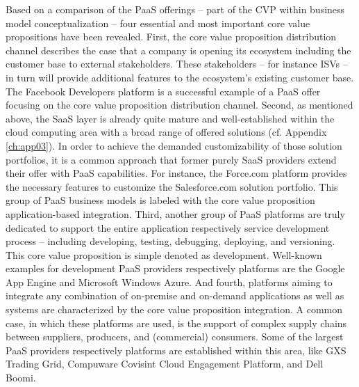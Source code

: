 Based on a comparison of the \ac{PaaS} offerings -- part of the \ac{CVP} within \citet{Johnson2008} business model conceptualization -- four essential and most important core value propositions have been revealed.  First, the core value proposition distribution channel describes the case that a company is opening its ecosystem including the customer base to external stakeholders. These stakeholders -- for instance \acp{ISV} -- in turn will provide additional features to the ecosystem's existing customer base. The Facebook Developers platform is a successful example of a \ac{PaaS} offer focusing on the core value proposition distribution channel. Second, as mentioned above, the \ac{SaaS} layer is already quite mature and well-established within the cloud computing area with a broad range of offered solutions (cf. Appendix \ref{ch:app03}). In order to achieve the demanded customizability of those solution portfolios, it is a common approach that former purely \ac{SaaS} providers extend their offer with \ac{PaaS} capabilities. For instance, the Force.com platform provides the necessary features to customize the Salesforce.com solution portfolio. This group of \ac{PaaS} business models is labeled with the core value proposition application-based integration. Third, another group of \ac{PaaS} platforms are truly dedicated to support the entire application respectively service development process -- including developing, testing, debugging, deploying, and versioning. This core value proposition is simple denoted as development. Well-known examples for development \ac{PaaS} providers respectively platforms are the Google App Engine and Microsoft Windows Azure. And fourth, platforms aiming to integrate any combination of on-premise and on-demand applications as well as systems are characterized by the core value proposition integration. A common case, in which these platforms are used, is the support of complex supply chains between suppliers, producers, and (commercial) consumers. Some of the largest \ac{PaaS} providers respectively platforms are established within this area, like GXS Trading Grid, Compuware Covisint Cloud Engagement Platform, and Dell Boomi.

